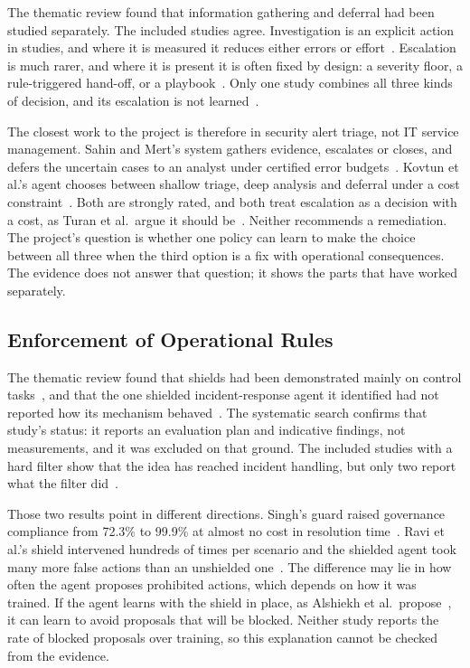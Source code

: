 The thematic review found that information gathering and deferral had been studied separately. The included studies agree. Investigation is an explicit action in \NInfo{} studies, and where it is measured it reduces either errors or effort~\cite{wu2026,kovtun2026,ghanem2026,wang2023hrlhf}. Escalation is much rarer, and where it is present it is often fixed by design: a severity floor, a rule-triggered hand-off, or a playbook~\cite{okafor2026,singh2026,koupaei2026}. Only one study combines all three kinds of decision, and its escalation is not learned~\cite{okafor2026}.

The closest work to the project is therefore in security alert triage, not IT service management. Sahin and Mert's system gathers evidence, escalates or closes, and defers the uncertain cases to an analyst under certified error budgets~\cite{sahin2026}. Kovtun et al.'s agent chooses between shallow triage, deep analysis and deferral under a cost constraint~\cite{kovtun2026}. Both are strongly rated, and both treat escalation as a decision with a cost, as Turan et al.\ argue it should be~\cite{turan2026}. Neither recommends a remediation. The project's question is whether one policy can learn to make the choice between all three when the third option is a fix with operational consequences. The evidence does not answer that question; it shows the parts that have worked separately.

\subsection{Enforcement of Operational Rules}

The thematic review found that shields had been demonstrated mainly on control tasks~\cite{alshiekh2018,konighofer2025}, and that the one shielded incident-response agent it identified had not reported how its mechanism behaved~\cite{alauthman2026}. The systematic search confirms that study's status: it reports an evaluation plan and indicative findings, not measurements, and it was excluded on that ground. The \NShield{} included studies with a hard filter show that the idea has reached incident handling, but only two report what the filter did~\cite{ravi2025,singh2026}.

Those two results point in different directions. Singh's guard raised governance compliance from 72.3\% to 99.9\% at almost no cost in resolution time~\cite{singh2026}. Ravi et al.'s shield intervened hundreds of times per scenario and the shielded agent took many more false actions than an unshielded one~\cite{ravi2025}. The difference may lie in how often the agent proposes prohibited actions, which depends on how it was trained. If the agent learns with the shield in place, as Alshiekh et al.\ propose~\cite{alshiekh2018}, it can learn to avoid proposals that will be blocked. Neither study reports the rate of blocked proposals over training, so this explanation cannot be checked from the evidence.

